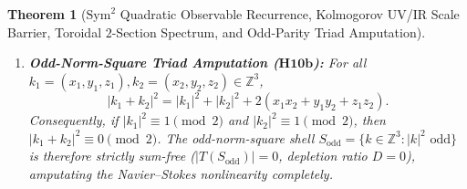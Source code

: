 \documentclass[11pt,a4paper]{article}
\newtheorem{theorem}{Theorem}[section]
\theoremstyle{definition}
\theoremstyle{remark}
\begin{document}
\begin{theorem}[$\mathrm{Sym}^2$ Quadratic Observable Recurrence, Kolmogorov UV/IR Scale Barrier, Toroidal $2$-Section Spectrum, and Odd-Parity Triad Amputation]
\begin{enumerate}
\begin{equation}\label{eq:torus_matrix}
A = 6(J - I) - 2P,
\end{equation}
where $J$ is the $n \times n$ all-ones matrix and $P_{u,v} = \delta_{v,-u}$ is the antipodal mode-reversal involution. Consequently, every vertex has degree $d(n) = 6(n-2)+4 = 6n-8 > 0$, the adjacency eigenvalues are $\{6n-8, -8, -4\}$, and the normalized Laplacian $L_{\mathrm{norm}} = I - \frac{1}{d(n)}A$ has exact spectrum
\begin{equation}\label{eq:torus_lap_spec}
\mathrm{Spec}(L_{\mathrm{norm}}) = \left\{0,\; \frac{6n}{6n-8},\; \frac{6n-4}{6n-8}\right\},
\end{equation}
with odd-sector eigenvalue $\gamma_{\mathrm{odd}}(n) = \frac{6n-4}{6n-8} > 1$ converging to $\gamma_\infty = 1$ as $n \to \infty$. Lean~4 covers the degree identity $6n-8$ and the odd-sector eigenvalue arithmetic (); the closed form~\eqref{eq:torus_matrix}, the full adjacency spectrum and the Laplacian spectrum are verified by the exact harness for $m = 3, 5$ and are stated here in prose.
\item \textbf{Odd-Norm-Square Triad Amputation ($\mathbf{H10b}$):} For all $k_1 = (x_1,y_1,z_1), k_2 = (x_2,y_2,z_2) \in \mathbb{Z}^3$,
\begin{equation}\label{eq:parity_id}
|k_1 + k_2|^2 = |k_1|^2 + |k_2|^2 + 2(x_1 x_2 + y_1 y_2 + z_1 z_2).
\end{equation}
Consequently, if $|k_1|^2 \equiv 1 \pmod 2$ and $|k_2|^2 \equiv 1 \pmod 2$, then $|k_1 + k_2|^2 \equiv 0 \pmod 2$. The odd-norm-square shell $S_{\mathrm{odd}} = \{k \in \mathbb{Z}^3 : |k|^2 \text{ odd}\}$ is therefore strictly sum-free ($|T(S_{\mathrm{odd}})| = 0$, depletion ratio $D = 0$), amputating the Navier--Stokes nonlinearity completely.
\end{enumerate}
\end{theorem}
\end{document}

